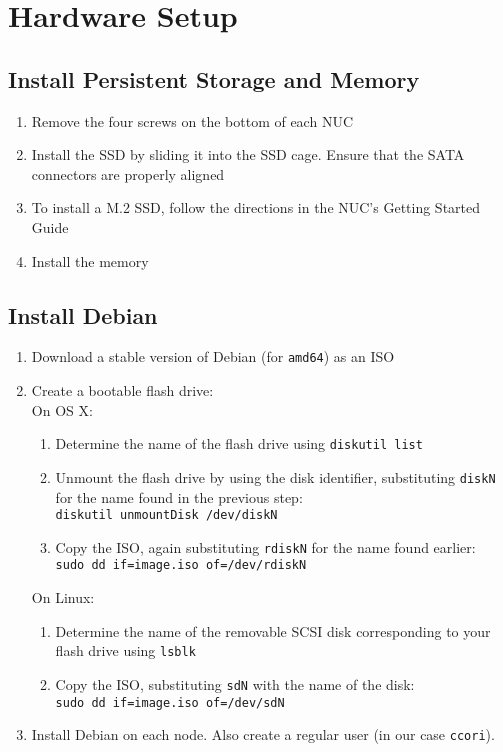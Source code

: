\documentclass{article}
\begin{document}
\section{Hardware Setup}
    \subsection{Install Persistent Storage and Memory}
    \begin{enumerate}
        \item Remove the four screws on the bottom of each NUC
        \item Install the SSD by sliding it into the SSD cage.  Ensure that the SATA
            connectors are properly aligned
        \item To install a M.2 SSD, follow the directions in the NUC's Getting Started
            Guide
        \item Install the memory
    \end{enumerate}
    \subsection{Install Debian}
    \begin{enumerate}
        \item Download a stable version of Debian (for \texttt{amd64}) as an ISO
        \item Create a bootable flash drive:\\
            On OS X:
            \begin{enumerate}
                \item Determine the name of the flash drive using
                    \texttt{diskutil list}
                \item Unmount the flash drive by using the disk identifier,
                    substituting \texttt{diskN} for the name found in the
                    previous step:\\
                    \texttt{diskutil unmountDisk /dev/diskN}
                \item Copy the ISO, again substituting \texttt{rdiskN} for the
                    name found earlier:\\
                    \texttt{sudo dd if=image.iso of=/dev/rdiskN}
            \end{enumerate}
            On Linux:
            \begin{enumerate}
                \item Determine the name of the removable SCSI disk
                    corresponding to your flash drive using
                    \texttt{lsblk}
                \item Copy the ISO, substituting \texttt{sdN} with the name of
                    the disk:\\
                    \texttt{sudo dd if=image.iso of=/dev/sdN}
            \end{enumerate}
        \item Install Debian on each node.  Also create a regular user (in our case
            \texttt{ccori}).
    \end{enumerate}
\end{document}
